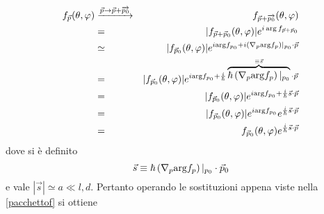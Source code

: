 \documentclass[../../FisicaTeorica.tex]{subfiles}
\begin{document}
\begin{eqnarray*}
  f_{\vec{p}} (\theta, \varphi) & \xrightarrow{\vec{p} \to \vec{p} +
  \overrightarrow{p_0}} & f_{\vec{p} + \overrightarrow{p_0}} (\theta,
  \varphi)\\
  & = & | f_{\vec{p} + \vec{p}_0} (\theta, \varphi) | e^{i \arg f_{\vec{p} +
  \vec{p}_0}}\\
  & \simeq & | f_{\vec{p}_0} (\theta, \varphi) | e^{i \mathrm{arg} f_{p_0} +
  i \left( \nabla_p \mathrm{arg} f_p \right) |_{p_0}  \cdot
  \vec{p}}\\
  & = & | f_{\vec{p}_0} (\theta, \varphi) | e^{i \mathrm{arg} f_{p_0} +
  \frac{i}{\hbar}  \overbrace{\hbar \left( \nabla_p \mathrm{arg} f_p \right)
  |_{p_0} }^{\equiv \vec{s}} \cdot \vec{p}_{}}\\
  & = & | f_{\vec{p}_0} (\theta, \varphi) | e^{i \mathrm{arg} f_{p_0} +
  \frac{i}{\hbar} \vec{s} \cdot \vec{p}}\\
  & = & | f_{\vec{p}_0} (\theta, \varphi) | e^{i \mathrm{arg} f_{p_0}}
  e^{\frac{i}{\hbar} \vec{s} \cdot \vec{p}}\\
  & = & f_{\vec{p}_0} (\theta, \varphi) e^{\frac{i}{\hbar} \vec{s} \cdot
  \vec{p}}
\end{eqnarray*}
\endgroup
dove si {\`e} definito
\[ \vec{s} \equiv \hbar \left( \nabla_p \mathrm{arg} f_p \right) |_{p_0}
    \cdot \vec{p}_0 \]
e vale $| \vec{s} | \simeq a \ll l, d$. Pertanto operando le sostituzioni appena viste nella \eqref{pacchettof} si ottiene
\begingroup
\allowdisplaybreaks
\end{document}
